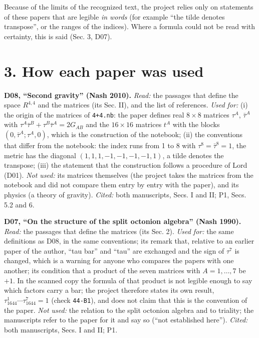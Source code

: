 \documentclass[
  10pt,
]{article}
\begin{document}
Because of the limits of the recognized text, the project relies only on
statements of these papers that are legible \emph{in words} (for example
``the tilde denotes transpose'', or the ranges of the indices). Where a
formula could not be read with certainty, this is said (Sec. 3, D07).

\hypertarget{how-each-paper-was-used}{%
\section{3. How each paper was used}\label{how-each-paper-was-used}}

\textbf{D08, ``Second gravity'' (Nash 2010).} \emph{Read:} the passages
that define the space \(R^{4,4}\) and the matrices (its Sec. II), and
the list of references. \emph{Used for:} (i) the origin of the matrices
of \texttt{4+4.nb}: the paper defines real \(8\times8\) matrices
\(\tau^A\), \(\bar\tau^A\) with
\(\tau^A\bar\tau^B+\tau^B\bar\tau^A=2G_{AB}\) and the \(16\times16\)
matrices \(t^A\) with the blocks \((0,\bar\tau^A;\tau^A,0)\), which is
the construction of the notebook; (ii) the conventions that differ from
the notebook: the index runs from 1 to 8 with \(\tau^8=\bar\tau^8=1\),
the metric has the diagonal \((1,1,1,-1,-1,-1,-1,1)\), a tilde denotes
the transpose; (iii) the statement that the construction follows a
procedure of Lord (D01). \emph{Not used:} its matrices themselves (the
project takes the matrices from the notebook and did not compare them
entry by entry with the paper), and its physics (a theory of gravity).
\emph{Cited:} both manuscripts, Secs. I and II; P1, Secs. 5.2 and 6.

\textbf{D07, ``On the structure of the split octonion algebra'' (Nash
1990).} \emph{Read:} the passages that define the matrices (its Sec. 2).
\emph{Used for:} the same definitions as D08, in the same conventions;
its remark that, relative to an earlier paper of the author, ``tau bar''
and ``tau'' are exchanged and the sign of \(\tau^7\) is changed, which
is a warning for anyone who compares the papers with one another; its
condition that a product of the seven matrices with \(A=1,\dots,7\) be
\(+1\). In the scanned copy the formula of that product is not legible
enough to say which factors carry a bar; the project therefore states
its own result, \(\tau_{1644}^1\cdots\tau_{1644}^7=1\) (check
\texttt{44-B1}), and does not claim that this is the convention of the
paper. \emph{Not used:} the relation to the split octonion algebra and
to triality; the manuscripts refer to the paper for it and say so (``not
established here''). \emph{Cited:} both manuscripts, Secs. I and II; P1.
\end{document}
